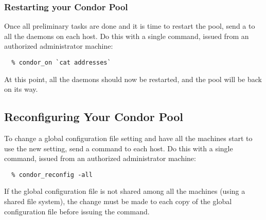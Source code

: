 \subsubsection{\label{sec:Pool-Restart}Restarting your Condor Pool}

Once all preliminary tasks are done and
it is time to restart the pool, send a
 to all the  daemons on each host.
Do this with a single command, issued from an authorized
administrator machine:
\begin{verbatim}
  % condor_on `cat addresses`
\end{verbatim}
At this point, all the daemons should now be restarted, and the pool
will be back on its way.

\subsection{\label{sec:Reconfigure-Pool}Reconfiguring Your Condor Pool}

To change a global configuration file setting and have all the
machines start to use the new setting, send a
 command to each host.
Do this with a single command, issued from an authorized
administrator machine:
\begin{verbatim}
  % condor_reconfig -all
\end{verbatim}

If the global configuration file is not shared among all the machines
(using a shared file system), the change must be made to each
copy of the global configuration file before issuing the 
command.



